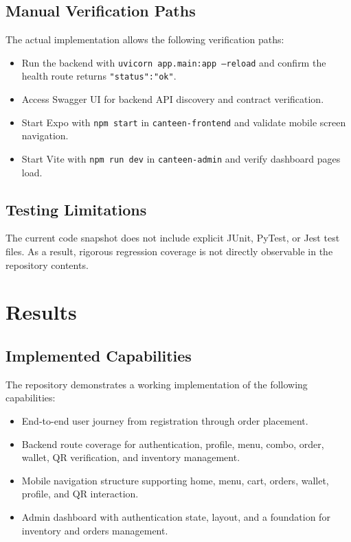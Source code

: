 \documentclass[12pt,a4paper]{report}
\begin{document}
\section{Manual Verification Paths}
The actual implementation allows the following verification paths:
\begin{itemize}
  \item Run the backend with \texttt{uvicorn app.main:app --reload} and confirm the health route returns \texttt{{"status":"ok"}}.
  \item Access Swagger UI for backend API discovery and contract verification.
  \item Start Expo with \texttt{npm start} in \texttt{canteen-frontend} and validate mobile screen navigation.
  \item Start Vite with \texttt{npm run dev} in \texttt{canteen-admin} and verify dashboard pages load.
\end{itemize}

\section{Testing Limitations}
The current code snapshot does not include explicit JUnit, PyTest, or Jest test files. As a result, rigorous regression coverage is not directly observable in the repository contents.

\chapter{Results}
\section{Implemented Capabilities}
The repository demonstrates a working implementation of the following capabilities:
\begin{itemize}
  \item End-to-end user journey from registration through order placement.
  \item Backend route coverage for authentication, profile, menu, combo, order, wallet, QR verification, and inventory management.
  \item Mobile navigation structure supporting home, menu, cart, orders, wallet, profile, and QR interaction.
  \item Admin dashboard with authentication state, layout, and a foundation for inventory and orders management.
\end{itemize}
\end{document}
